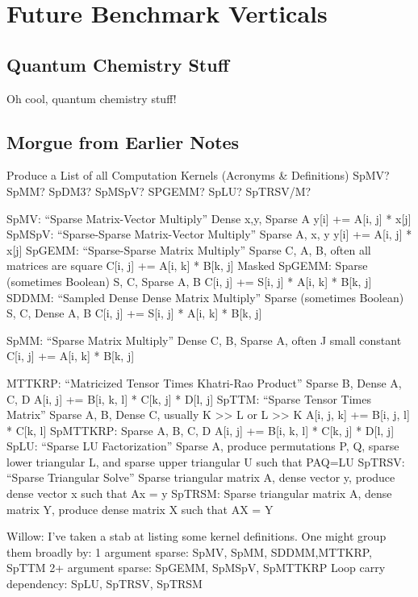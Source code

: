 \documentclass{article}
\begin{document}
\section{Future Benchmark Verticals}

\subsection{Quantum Chemistry Stuff}
Oh cool, quantum chemistry stuff!

\subsection{Morgue from Earlier Notes}

Produce a List of all Computation Kernels (Acronyms & Definitions)
SpMV? SpMM? SpDM3? SpMSpV? SPGEMM? SpLU? SpTRSV/M?

SpMV:
	“Sparse Matrix-Vector Multiply”
Dense x,y, Sparse A
y[i] += A[i, j] * x[j]
SpMSpV:
	“Sparse-Sparse Matrix-Vector Multiply”
Sparse A, x, y
y[i] += A[i, j] * x[j]
SpGEMM:
	“Sparse-Sparse Matrix Multiply”
Sparse C, A, B, often all matrices are square
C[i, j] += A[i, k] * B[k, j]
Masked SpGEMM:
	Sparse (sometimes Boolean) S, C, Sparse A, B
C[i, j] += S[i, j] * A[i, k] * B[k, j]
SDDMM:
	“Sampled Dense Dense Matrix Multiply”
	Sparse (sometimes Boolean) S, C, Dense A, B
C[i, j] += S[i, j] * A[i, k] * B[k, j]

SpMM:
	“Sparse Matrix Multiply”
Dense C, B, Sparse A, often J small constant
C[i, j] += A[i, k] * B[k, j]

MTTKRP:
	“Matricized Tensor Times Khatri-Rao Product”
Sparse B, Dense A, C, D
A[i, j] += B[i, k, l] * C[k, j] * D[l, j]
SpTTM:
	“Sparse Tensor Times Matrix”
Sparse A, B, Dense C, usually K >> L or L >> K
A[i, j, k] += B[i, j, l] * C[k, l]
SpMTTKRP:
Sparse A, B, C, D
A[i, j] += B[i, k, l] * C[k, j] * D[l, j]
SpLU:
	“Sparse LU Factorization”
Sparse A, produce permutations P, Q, sparse lower triangular L, and sparse upper triangular U
such that PAQ=LU
SpTRSV:
	“Sparse Triangular Solve”
	Sparse triangular matrix A, dense vector y, produce dense vector x such that Ax = y
SpTRSM:
	Sparse triangular matrix A, dense matrix Y, produce dense matrix X such that AX = Y

Willow: I’ve taken a stab at listing some kernel definitions. One might group them broadly by:
	1 argument sparse: SpMV, SpMM, SDDMM,MTTKRP, SpTTM
	2+ argument sparse: SpGEMM, SpMSpV, SpMTTKRP
	Loop carry dependency: SpLU, SpTRSV, SpTRSM

	
\end{document}
